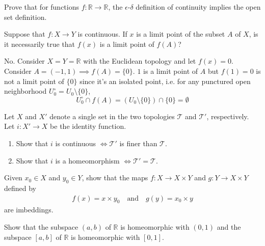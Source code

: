   \begin{exercise}[Munkres 18.1]
    Prove that for functions $f : \mathbb{R} \to \mathbb{R}$, the $\epsilon$-$\delta$ definition of continuity implies the open set definition.
  \end{exercise}

  \begin{exercise}[Munkres 18.2]
    Suppose that $f : X \to Y$ is continuous. If $x$ is a limit point of the subset $A$ of $X$, is it necessarily true that $f(x)$ is a limit point of $f(A)$?
  \end{exercise}
  \begin{solution}
    No. Consider $X = Y = \mathbb{R}$ with the Euclidean topology and let $f(x) = 0$. Consider $A = (-1, 1) \implies f(A) = \{0\}$. $1$ is a limit point of $A$ but $f(1) = 0$ is not a limit point of $\{0\}$ since it's an isolated point, i.e. for any punctured open neighborhood $U_0^\circ = U_0 \setminus \{0\}$, 
    \begin{equation}
      U_0^\circ \cap f(A) = (U_0 \setminus \{0\}) \cap \{0\} = \emptyset
    \end{equation}
  \end{solution}

  \begin{exercise}[Munkres 18.3]
    Let $X$ and $X'$ denote a single set in the two topologies $\mathcal{T}$ and $\mathcal{T}'$, respectively. Let $i : X' \to X$ be the identity function.
    \begin{enumerate}
      \item Show that $i$ is continuous $\Leftrightarrow \mathcal{T}'$ is finer than $\mathcal{T}$.
      \item Show that $i$ is a homeomorphism $\Leftrightarrow \mathcal{T}' = \mathcal{T}$.
    \end{enumerate}
  \end{exercise}

  \begin{exercise}[Munkres 18.4]
    Given $x_0 \in X$ and $y_0 \in Y$, show that the maps $f : X \to X \times Y$ and $g : Y \to X \times Y$ defined by
    \begin{align*}
      f(x) = x \times y_0 \quad \text{and} \quad g(y) = x_0 \times y
    \end{align*}
    are imbeddings.
  \end{exercise}

  \begin{exercise}[Munkres 18.5]
    Show that the subspace $(a, b)$ of $\mathbb{R}$ is homeomorphic with $(0, 1)$ and the subspace $[a, b]$ of $\mathbb{R}$ is homeomorphic with $[0, 1]$.
  \end{exercise}

